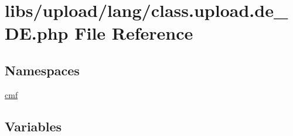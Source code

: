 \hypertarget{class_8upload_8de___d_e_8php}{}\section{libs/upload/lang/class.upload.\+de\+\_\+\+D\+E.\+php File Reference}
\label{class_8upload_8de___d_e_8php}
\subsection*{Namespaces}
\begin{DoxyCompactItemize}
\item 
 \hyperlink{namespacecmf}{cmf}
\end{DoxyCompactItemize}
\subsection*{Variables}
